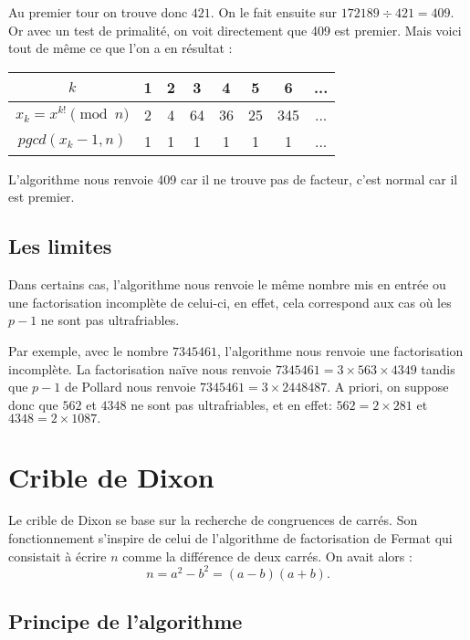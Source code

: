\documentclass[french, 12pt, titlepage]{article}
\begin{document}
Au premier tour on trouve donc $421$. On le fait ensuite sur $172189 \div 421 = 409.$ Or avec un test de primalité, on voit directement que 409 est premier. Mais voici tout de même ce que l'on a en résultat : 

\begin{center}
\begin{tabular}{|c||c|c|c|c|c|c|c|}
\hline
$k$ & 1 & 2 & 3 & 4 & 5 & 6 & ... \\
\hline
$x_k = x^{k!} \pmod n$ & 2 & 4 & 64 & 36 & 25 & 345 & ... \\
\hline
$pgcd(x_k -1, n)$ & 1 & 1 & 1 & 1 & 1 & 1 & ...\\
\hline
\end{tabular}
\end{center}

L'algorithme nous renvoie 409 car il ne trouve pas de facteur, c'est normal car il est premier.

\subsection{Les limites}

Dans certains cas, l'algorithme nous renvoie le même nombre mis en entrée ou une factorisation incomplète de celui-ci, en effet, cela correspond aux cas où les $p-1$ ne sont pas ultrafriables.

Par exemple, avec le nombre $7345461$, l'algorithme nous renvoie une factorisation incomplète.
La factorisation naïve nous renvoie $7345461 = 3 \times 563 \times 4349$ tandis que $p-1$ de Pollard nous renvoie $7345461 = 3 \times 2448487.$
A priori, on suppose donc que $562$ et $4348$ ne sont pas ultrafriables, et en effet:
$562 = 2 \times 281$ et $4348 = 2 \times 1087.$



\section{Crible de Dixon}

Le crible de Dixon se base sur la recherche de congruences de
carrés. Son fonctionnement s'inspire de celui de l'algorithme de
factorisation de Fermat qui consistait à écrire $n$ comme la
différence de deux carrés. On avait alors : \[n = a^2 - b^2 = (a - b)(a + b).\]

\subsection{Principe de l'algorithme}
\end{document}

